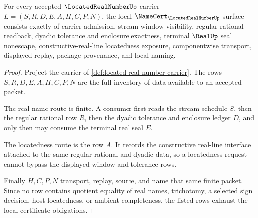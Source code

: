 \begin{theorem}
\label{thm:located-real-number-namecert-obligations}
For every accepted $\LocatedRealNumberUp$ carrier $L=(S,R,D,E,A,H,C,P,N)$, the local $\NameCert_{\LocatedRealNumberUp}$ surface consists exactly of carrier admission, stream-window visibility, regular-rational readback, dyadic tolerance and enclosure exactness, terminal $\RealUp$ seal nonescape, constructive-real-line locatedness exposure, componentwise transport, displayed replay, package provenance, and local naming.
\end{theorem}
\begin{proof}
Project the carrier of \autoref{def:located-real-number-carrier}. The rows $S,R,D,E,A,H,C,P,N$ are the full inventory of data available to an accepted packet.

The real-name route is finite. A consumer first reads the stream schedule $S$, then the regular rational row $R$, then the dyadic tolerance and enclosure ledger $D$, and only then may consume the terminal real seal $E$.

The locatedness route is the row $A$. It records the constructive real-line interface attached to the same regular rational and dyadic data, so a locatedness request cannot bypass the displayed window and tolerance rows.

Finally $H,C,P,N$ transport, replay, source, and name that same finite packet. Since no row contains quotient equality of real names, trichotomy, a selected sign decision, host locatedness, or ambient completeness, the listed rows exhaust the local certificate obligations.
\end{proof}

